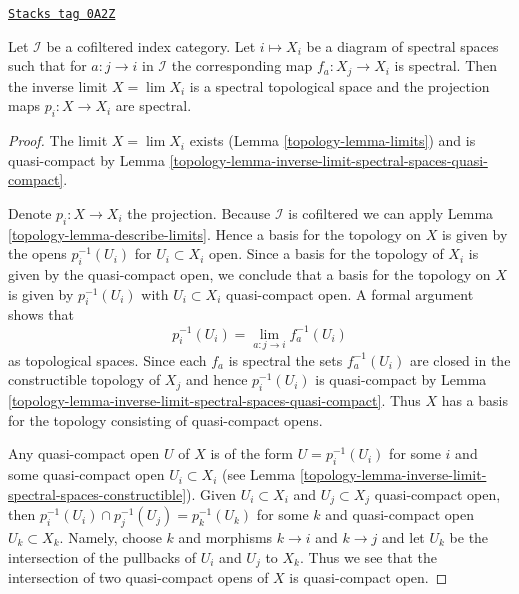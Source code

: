 \begin{lemma}
\label{topology-lemma-directed-inverse-limit-spectral-spaces}
\href{https://stacks.math.columbia.edu/tag/0A2Z}{\texttt{Stacks tag 0A2Z}}

Let $\mathcal{I}$ be a cofiltered index category.
Let $i \mapsto X_i$ be a diagram of spectral spaces such
that for $a : j \to i$ in $\mathcal{I}$ the corresponding map
$f_a : X_j \to X_i$ is spectral. Then
the inverse limit $X = \lim X_i$ is a spectral topological space
and the projection maps $p_i : X \to X_i$ are spectral.
\end{lemma}

\begin{proof}

The limit $X = \lim X_i$ exists (Lemma \ref{topology-lemma-limits})
and is quasi-compact by
Lemma \ref{topology-lemma-inverse-limit-spectral-spaces-quasi-compact}.

\medskip\noindent
Denote $p_i : X \to X_i$ the projection.
Because $\mathcal{I}$ is cofiltered we can apply
Lemma \ref{topology-lemma-describe-limits}.
Hence a basis for the topology on $X$ is given by the opens
$p_i^{-1}(U_i)$ for $U_i \subset X_i$ open. Since a basis for
the topology of $X_i$ is given by the quasi-compact open, we conclude
that a basis for the topology on $X$ is given by $p_i^{-1}(U_i)$
with $U_i \subset X_i$ quasi-compact open. A formal argument
shows that
$$
p_i^{-1}(U_i) = \lim_{a : j \to i} f_a^{-1}(U_i)
$$
as topological spaces. Since each $f_a$ is spectral the sets
$f_a^{-1}(U_i)$ are closed in the constructible topology of $X_j$
and hence $p_i^{-1}(U_i)$ is quasi-compact
by Lemma \ref{topology-lemma-inverse-limit-spectral-spaces-quasi-compact}.
Thus $X$ has a basis for the topology consisting of quasi-compact opens.

\medskip\noindent
Any quasi-compact open $U$ of $X$ is of the form $U = p_i^{-1}(U_i)$
for some $i$ and some quasi-compact open $U_i \subset X_i$
(see Lemma \ref{topology-lemma-inverse-limit-spectral-spaces-constructible}).
Given $U_i \subset X_i$ and $U_j \subset X_j$ quasi-compact open, then
$p_i^{-1}(U_i) \cap p_j^{-1}(U_j) = p_k^{-1}(U_k)$ for some $k$
and quasi-compact open $U_k \subset X_k$. Namely, choose $k$
and morphisms $k \to i$ and $k \to j$ and let $U_k$ be the intersection of the
pullbacks of $U_i$ and $U_j$ to $X_k$. Thus we see that the intersection
of two quasi-compact opens of $X$ is quasi-compact open.


\end{proof}
